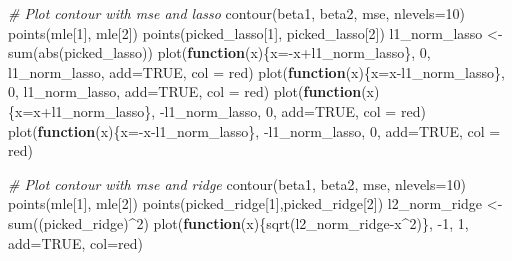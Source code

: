 \documentclass[
]{article}
\newenvironment{Shaded}{\begin{snugshade}}{\end{snugshade}}
\newcommand{\AttributeTok}[1]{\textcolor[rgb]{0.77,0.63,0.00}{#1}}
\newcommand{\CommentTok}[1]{\textcolor[rgb]{0.56,0.35,0.01}{\textit{#1}}}
\newcommand{\ConstantTok}[1]{\textcolor[rgb]{0.00,0.00,0.00}{#1}}
\newcommand{\ControlFlowTok}[1]{\textcolor[rgb]{0.13,0.29,0.53}{\textbf{#1}}}
\newcommand{\DecValTok}[1]{\textcolor[rgb]{0.00,0.00,0.81}{#1}}
\newcommand{\FunctionTok}[1]{\textcolor[rgb]{0.00,0.00,0.00}{#1}}
\newcommand{\NormalTok}[1]{#1}
\newcommand{\OtherTok}[1]{\textcolor[rgb]{0.56,0.35,0.01}{#1}}
\newcommand{\SpecialCharTok}[1]{\textcolor[rgb]{0.00,0.00,0.00}{#1}}
\newcommand{\StringTok}[1]{\textcolor[rgb]{0.31,0.60,0.02}{#1}}
\begin{document}
\begin{Shaded}
\begin{Highlighting}[]
\CommentTok{\# Plot contour with mse and lasso}
\FunctionTok{contour}\NormalTok{(beta1, beta2, mse, }\AttributeTok{nlevels=}\DecValTok{10}\NormalTok{)}
\FunctionTok{points}\NormalTok{(mle[}\DecValTok{1}\NormalTok{], mle[}\DecValTok{2}\NormalTok{])}
\FunctionTok{points}\NormalTok{(picked\_lasso[}\DecValTok{1}\NormalTok{], picked\_lasso[}\DecValTok{2}\NormalTok{])}
\NormalTok{l1\_norm\_lasso }\OtherTok{\textless{}{-}} \FunctionTok{sum}\NormalTok{(}\FunctionTok{abs}\NormalTok{(picked\_lasso))}
\FunctionTok{plot}\NormalTok{(}\ControlFlowTok{function}\NormalTok{(x)\{x}\OtherTok{=}\SpecialCharTok{{-}}\NormalTok{x}\SpecialCharTok{+}\NormalTok{l1\_norm\_lasso\}, }\DecValTok{0}\NormalTok{, l1\_norm\_lasso, }\AttributeTok{add=}\ConstantTok{TRUE}\NormalTok{, }\AttributeTok{col =} \StringTok{\textquotesingle{}red\textquotesingle{}}\NormalTok{)}
\FunctionTok{plot}\NormalTok{(}\ControlFlowTok{function}\NormalTok{(x)\{x}\OtherTok{=}\NormalTok{x}\SpecialCharTok{{-}}\NormalTok{l1\_norm\_lasso\}, }\DecValTok{0}\NormalTok{, l1\_norm\_lasso, }\AttributeTok{add=}\ConstantTok{TRUE}\NormalTok{, }\AttributeTok{col =} \StringTok{\textquotesingle{}red\textquotesingle{}}\NormalTok{)}
\FunctionTok{plot}\NormalTok{(}\ControlFlowTok{function}\NormalTok{(x)\{x}\OtherTok{=}\NormalTok{x}\SpecialCharTok{+}\NormalTok{l1\_norm\_lasso\}, }\SpecialCharTok{{-}}\NormalTok{l1\_norm\_lasso, }\DecValTok{0}\NormalTok{, }\AttributeTok{add=}\ConstantTok{TRUE}\NormalTok{, }\AttributeTok{col =} \StringTok{\textquotesingle{}red\textquotesingle{}}\NormalTok{)}
\FunctionTok{plot}\NormalTok{(}\ControlFlowTok{function}\NormalTok{(x)\{x}\OtherTok{=}\SpecialCharTok{{-}}\NormalTok{x}\SpecialCharTok{{-}}\NormalTok{l1\_norm\_lasso\}, }\SpecialCharTok{{-}}\NormalTok{l1\_norm\_lasso, }\DecValTok{0}\NormalTok{, }\AttributeTok{add=}\ConstantTok{TRUE}\NormalTok{, }\AttributeTok{col =} \StringTok{\textquotesingle{}red\textquotesingle{}}\NormalTok{)}

\CommentTok{\# Plot contour with mse and ridge}
\FunctionTok{contour}\NormalTok{(beta1, beta2, mse, }\AttributeTok{nlevels=}\DecValTok{10}\NormalTok{)}
\FunctionTok{points}\NormalTok{(mle[}\DecValTok{1}\NormalTok{], mle[}\DecValTok{2}\NormalTok{])}
\FunctionTok{points}\NormalTok{(picked\_ridge[}\DecValTok{1}\NormalTok{],picked\_ridge[}\DecValTok{2}\NormalTok{])}
\NormalTok{l2\_norm\_ridge }\OtherTok{\textless{}{-}} \FunctionTok{sum}\NormalTok{((picked\_ridge)}\SpecialCharTok{\^{}}\DecValTok{2}\NormalTok{)}
\FunctionTok{plot}\NormalTok{(}\ControlFlowTok{function}\NormalTok{(x)\{}\FunctionTok{sqrt}\NormalTok{(l2\_norm\_ridge}\SpecialCharTok{{-}}\NormalTok{x}\SpecialCharTok{\^{}}\DecValTok{2}\NormalTok{)\}, }\SpecialCharTok{{-}}\DecValTok{1}\NormalTok{, }\DecValTok{1}\NormalTok{, }\AttributeTok{add=}\ConstantTok{TRUE}\NormalTok{, }\AttributeTok{col=}\StringTok{\textquotesingle{}red\textquotesingle{}}\NormalTok{)}
\end{Highlighting}
\end{Shaded}
\end{document}
